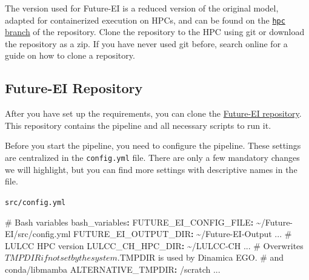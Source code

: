 \documentclass[
  letterpaper,
  DIV=11,
  numbers=noendperiod]{scrreprt}
\newenvironment{Shaded}{\begin{snugshade}}{\end{snugshade}}
\newcommand{\AttributeTok}[1]{\textcolor[rgb]{0.40,0.45,0.13}{#1}}
\newcommand{\CommentTok}[1]{\textcolor[rgb]{0.37,0.37,0.37}{#1}}
\newcommand{\FunctionTok}[1]{\textcolor[rgb]{0.28,0.35,0.67}{#1}}
\newcommand{\KeywordTok}[1]{\textcolor[rgb]{0.00,0.23,0.31}{\textbf{#1}}}
\begin{document}
The version used for Future-EI is a reduced version of the original
model, adapted for containerized execution on HPCs, and can be found on
the \href{https://github.com/blenback/LULCC-CH/tree/hpc}{\texttt{hpc}
branch} of the repository. Clone the repository to the HPC using git or
download the repository as a zip. If you have never used git before,
search online for a guide on how to clone a repository.

\subsection{Future-EI Repository}\label{future-ei-repository}

After you have set up the requirements, you can clone the
\href{https://github.com/cbueth/Future-EI}{Future-EI repository}. This
repository contains the pipeline and all necessary scripts to run it.

Before you start the pipeline, you need to configure the pipeline. These
settings are centralized in the \texttt{config.yml} file. There are only
a few mandatory changes we will highlight, but you can find more
settings with descriptive names in the file.

\begin{codelisting}

\caption{\texttt{src/config.yml}}

\begin{Shaded}
\begin{Highlighting}[]
\CommentTok{\# Bash variables}
\FunctionTok{bash\_variables}\KeywordTok{:}
\AttributeTok{  }\FunctionTok{FUTURE\_EI\_CONFIG\_FILE}\KeywordTok{:}\AttributeTok{ \textasciitilde{}/Future{-}EI/src/config.yml}
\AttributeTok{  }\FunctionTok{FUTURE\_EI\_OUTPUT\_DIR}\KeywordTok{:}\AttributeTok{ \textasciitilde{}/Future{-}EI{-}Output}
\AttributeTok{  ...}
\CommentTok{  \# LULCC HPC version}
\AttributeTok{  }\FunctionTok{LULCC\_CH\_HPC\_DIR}\KeywordTok{:}\AttributeTok{ \textasciitilde{}/LULCC{-}CH}
\AttributeTok{  ...}
\CommentTok{  \# Overwrites $TMPDIR if not set by the system. $TMPDIR is used by Dinamica EGO.}
\CommentTok{  \# and conda/libmamba}
\AttributeTok{  }\FunctionTok{ALTERNATIVE\_TMPDIR}\KeywordTok{:}\AttributeTok{ /scratch}
\CommentTok{...}
\end{Highlighting}
\end{Shaded}

\end{codelisting}
\end{document}
